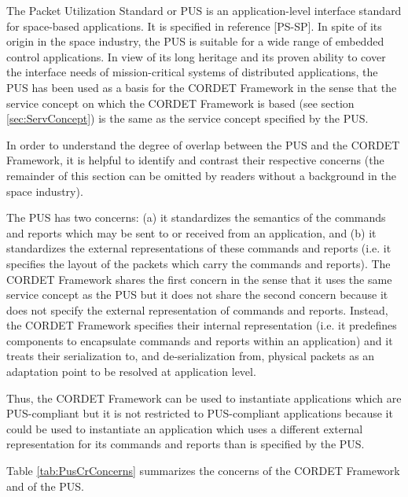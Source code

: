 The Packet Utilization Standard or PUS is an application-level interface standard for space-based applications. 
It is specified in reference [PS-SP]. 
In spite of its origin in the space industry, the PUS is suitable for a wide range of embedded control applications. 
In view of its long heritage and its proven ability to cover the interface needs of mission-critical systems of distributed applications, the PUS  has been used as a basis for the CORDET Framework in the sense that the service concept on which the CORDET Framework is based (see section \ref{sec:ServConcept}) is the same as the service concept specified by the PUS. 

In order to understand the degree of overlap between the PUS and the CORDET Framework, it is helpful to identify and contrast their respective concerns (the remainder of this section can be omitted by readers without a background in the space industry).

The PUS has two concerns: (a) it standardizes the semantics of the commands and reports which may be sent to or received from an application, and (b) it standardizes the external representations of these commands and reports (i.e. it specifies the layout of the packets which carry the commands and reports). 
The CORDET Framework shares the first concern in the sense that it uses the same service concept as the PUS but it does not share the second concern because it does not specify the external representation of commands and reports. 
Instead, the CORDET Framework specifies their internal representation (i.e. it predefines components to encapsulate commands and reports within an application) and it treats their serialization to, and de-serialization from, physical packets as an adaptation point to be resolved at application level.  
 
Thus, the CORDET Framework can be used to instantiate applications which are PUS-compliant but it is not restricted to PUS-compliant applications because it could be used to instantiate an application which uses a different external representation for its commands and reports than is specified by the PUS.

Table \ref{tab:PusCrConcerns} summarizes the concerns of the CORDET Framework and of the PUS.

